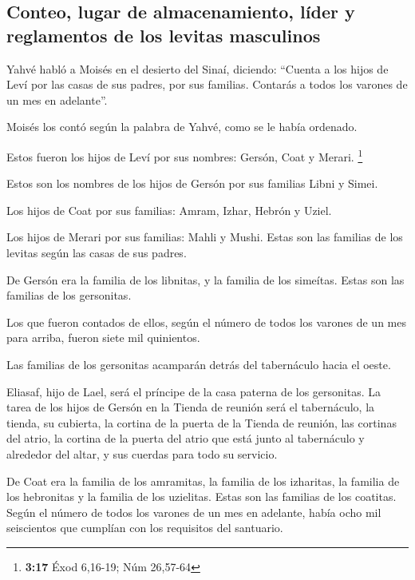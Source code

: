 \begin{paracol}{2}
\hypertarget{conteo-lugar-de-almacenamiento-luxedder-y-reglamentos-de-los-levitas-masculinos}{%
\subsection{Conteo, lugar de almacenamiento, líder y reglamentos de los
levitas
masculinos}\label{conteo-lugar-de-almacenamiento-luxedder-y-reglamentos-de-los-levitas-masculinos}}

 Yahvé habló a Moisés en el desierto del Sinaí, diciendo:
 ``Cuenta a los hijos de Leví por las casas de sus
padres, por sus familias. Contarás a todos los varones de un mes en
adelante''.

 Moisés los contó según la palabra de Yahvé, como se le
había ordenado.

 Estos fueron los hijos de Leví por sus nombres: Gersón,
Coat y Merari. \footnote{\textbf{3:17} Éxod 6,16-19; Núm 26,57-64}

 Estos son los nombres de los hijos de Gersón por sus
familias Libni y Simei.

 Los hijos de Coat por sus familias: Amram, Izhar, Hebrón
y Uziel.

 Los hijos de Merari por sus familias: Mahli y Mushi.
Estas son las familias de los levitas según las casas de sus padres.

 De Gersón era la familia de los libnitas, y la familia
de los simeítas. Estas son las familias de los gersonitas.

 Los que fueron contados de ellos, según el número de
todos los varones de un mes para arriba, fueron siete mil quinientos.

 Las familias de los gersonitas acamparán detrás del
tabernáculo hacia el oeste.

 Eliasaf, hijo de Lael, será el príncipe de la casa
paterna de los gersonitas.  La tarea de los hijos de
Gersón en la Tienda de reunión será el tabernáculo, la tienda, su
cubierta, la cortina de la puerta de la Tienda de reunión,
 las cortinas del atrio, la cortina de la puerta del
atrio que está junto al tabernáculo y alrededor del altar, y sus cuerdas
para todo su servicio.

 De Coat era la familia de los amramitas, la familia de
los izharitas, la familia de los hebronitas y la familia de los
uzielitas. Estas son las familias de los coatitas.  Según
el número de todos los varones de un mes en adelante, había ocho mil
seiscientos que cumplían con los requisitos del santuario.


\end{paracol}
